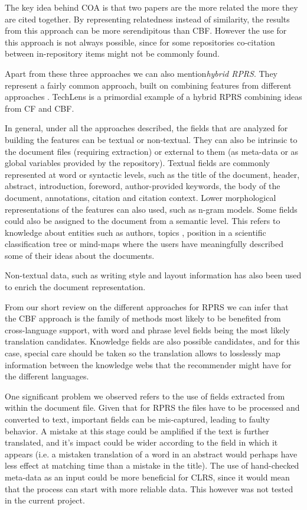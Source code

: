 \documentclass{llncs}
\begin{document}
The key idea behind COA is that two papers are the more related the more they are cited together. By representing relatedness instead of similarity, the results from this approach can be more serendipitous than CBF. However the use for this approach is not always possible, since for some repositories co-citation between in-repository items might not be commonly found.

Apart from these three approaches we can also mention\textit{hybrid RPRS}. They represent a fairly common approach, built on combining features from different approaches \cite{sugiyama2014comprehensive}\cite{dong2009digging}. TechLens is a primordial example of a hybrid RPRS combining ideas from CF and CBF\cite{ekstrand2010automatically}.

In general, under all the approaches described, the fields that are analyzed for building the features can be textual or non-textual. They can also be intrinsic to the document files (requiring extraction) or external to them (as meta-data or as global variables provided by the repository). Textual fields are commonly represented at word or syntactic levels, such as the title of the document, header, abstract, introduction, foreword, author-provided keywords, the body of the document, annotations, citation and citation context. Lower morphological representations of the features can also used, such as n-gram models\cite{ferrara2011keyphrase}. Some fields could also be assigned to the document from a semantic level. This refers to knowledge about entities such as authors, topics \cite{jiang2012recommending}\cite{bethard2010should}, position in a scientific classification tree or mind-maps where the users have meaningfully described some of their ideas about the documents. 

Non-textual data, such as writing style and layout information has also been used to enrich the document representation.

From our short review on the different approaches for RPRS we can infer that the CBF approach is the family of methods most likely to be benefited from cross-language support, with word and phrase level fields being the most likely translation candidates. Knowledge fields are also possible candidates, and for this case, special care should be taken so the translation allows to losslessly map information between the knowledge webs that the recommender might have for the different languages.

One significant problem we observed refers to the use of fields extracted from within the document file. Given that for RPRS the files have to be processed and converted to text, important fields can be mis-captured, leading to faulty behavior. A mistake at this stage could be amplified if the text is further translated, and it's impact could be wider according to the field in which it appears (i.e. a mistaken translation of a word in an abstract would perhaps have less effect at matching time than a mistake in the title). The use of hand-checked meta-data as an input could be more beneficial for CLRS, since it would mean that the process can start with more reliable data. This however was not tested in the current project.
\end{document}
